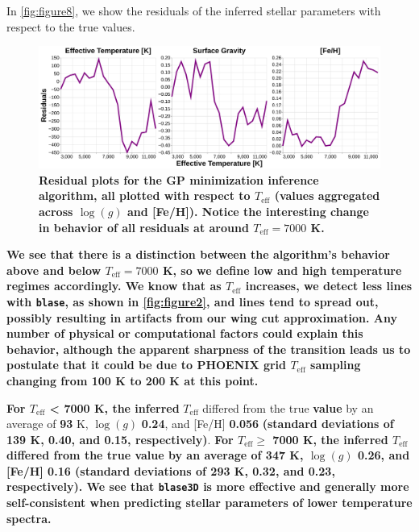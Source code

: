 \documentclass[twocolumn, linenumbers]{aastex631}
\begin{document}
In \autoref{fig:figure8}, we show the residuals of the inferred stellar parameters with respect to the true values.
\begin{figure}
    \centering
    \includegraphics[width=\textwidth]{figure8}
    \caption{\textbf{Residual plots for the GP minimization inference algorithm, all plotted with respect to $T_\text{eff}$ (values aggregated across $\log(g)$ and [Fe/H]).
    Notice the interesting change in behavior of all residuals at around $T_\text{eff} = 7000$ K.}}
    \label{fig:figure8}
\end{figure}
\textbf{We see that there is a distinction between the algorithm's behavior above and below $T_{\mathrm{eff}} = 7000$ K, so we define low and high temperature regimes accordingly.
We know that as $T_\text{eff}$ increases, we detect less lines with \texttt{blase}, as shown in \autoref{fig:figure2}, and lines tend to spread out, possibly resulting in artifacts from our wing cut approximation.
Any number of physical or computational factors could explain this behavior, although the apparent sharpness of the transition leads us to postulate that it could be due to PHOENIX grid $T_\text{eff}$ sampling changing from 100 K to 200 K at this point.}

\textbf{For $T_{\mathrm{eff}}$ < 7000 K, the inferred} $T_{\mathrm{eff}}$ differed from the true \textbf{value} by an average of \textbf{93} K, $\log(g)$ \textbf{0.24}, and [Fe/H] \textbf{0.056} \textbf{(standard deviations of 139 K, 0.40, and 0.15, respectively)}.
\textbf{For $T_{\mathrm{eff}} \ge$ 7000 K, the inferred $T_{\mathrm{eff}}$ differed from the true value by an average of 347 K, $\log(g)$ 0.26, and [Fe/H] 0.16 (standard deviations of 293 K, 0.32, and 0.23, respectively).
We see that \texttt{blase3D} is more effective and generally more self-consistent when predicting stellar parameters of lower temperature spectra.}
\end{document}
